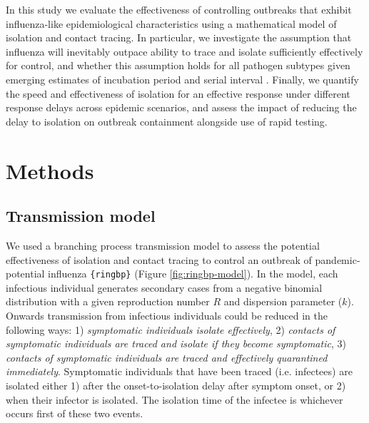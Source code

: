 \documentclass{article}
\begin{document}

In this study we evaluate the effectiveness of controlling outbreaks that exhibit influenza-like epidemiological characteristics using a mathematical model of isolation and contact tracing. In particular, we investigate the assumption that influenza will inevitably outpace ability to trace and isolate sufficiently effectively for control, and whether this assumption holds for all pathogen subtypes given emerging estimates of incubation period and serial interval \citep{Ward2024.12.11.24318702}. Finally, we quantify the speed and effectiveness of isolation for an effective response under different response delays across epidemic scenarios, and assess the impact of reducing the delay to isolation on outbreak containment alongside use of rapid testing.

\section*{Methods}

\subsection*{Transmission model}
We used a branching process transmission model to assess the potential effectiveness of isolation and contact tracing to control an outbreak of pandemic-potential influenza \texttt{\{ringbp\}} \citep{hellewellRingbpSimulateEvaluate2025} (Figure \ref{fig:ringbp-model}). In the model, each infectious individual generates secondary cases from a negative binomial distribution with a given reproduction number $R$ and dispersion parameter ($k$). Onwards transmission from infectious individuals could be reduced in the following ways: 1) \textit{symptomatic individuals isolate effectively}, 2) \textit{contacts of symptomatic individuals are traced and isolate if they become symptomatic}, 3) \textit{contacts of symptomatic individuals are traced and effectively quarantined immediately}. Symptomatic individuals that have been traced (i.e. infectees) are isolated either 1) after the onset-to-isolation delay after symptom onset, or 2) when their infector is isolated. The isolation time of the infectee is whichever occurs first of these two events. 
\end{document}
